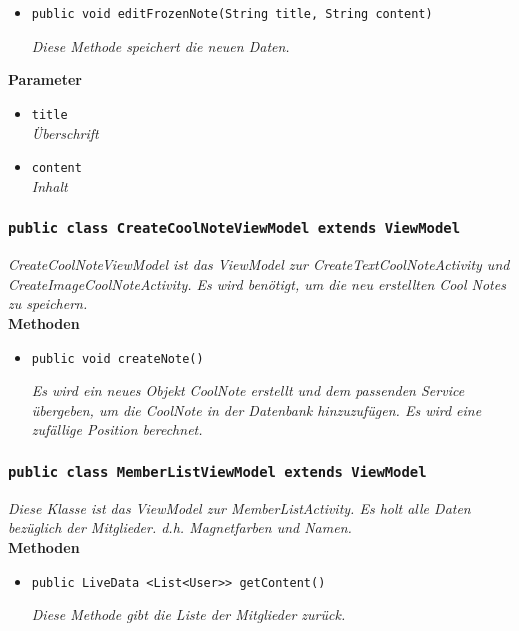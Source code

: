         	\begin{itemize}
        		\item\texttt{{public void editFrozenNote(String title, String content)}}
        	
        		\textit{Diese Methode speichert die neuen Daten.}
        		
        	\end{itemize}
        	
        	\textbf{Parameter}
        	\begin{itemize}
        		\item\texttt{title}\\
				\textit{Überschrift}
				\item\texttt{content}\\
				\textit{Inhalt}
			\end{itemize}
       		 
           		\subsubsection{\texttt{public class CreateCoolNoteViewModel extends ViewModel}}
        \textit{CreateCoolNoteViewModel ist das ViewModel zur CreateTextCoolNoteActivity und CreateImageCoolNoteActivity. Es wird benötigt, um die neu erstellten Cool Notes zu speichern.}\\
        
		\textbf{Methoden}
 			\begin{itemize}
        		\item\texttt{{public void createNote()}}
        	
        		\textit{Es wird ein neues Objekt CoolNote erstellt und dem passenden Service übergeben, um die CoolNote in der Datenbank hinzuzufügen. Es wird eine zufällige Position berechnet.}
        	
       		\end{itemize}
       		 
           		\subsubsection{\texttt{public class MemberListViewModel extends ViewModel}}
        \textit{Diese Klasse ist das ViewModel zur MemberListActivity. Es holt alle Daten bezüglich der Mitglieder. d.h. Magnetfarben und Namen.}\\
        
		\textbf{Methoden}
 			\begin{itemize}
        		\item\texttt{{public LiveData <List<User>> getContent()}}
        	
        		\textit{Diese Methode gibt die Liste der Mitglieder zurück.}
        	\end{itemize}
        	
